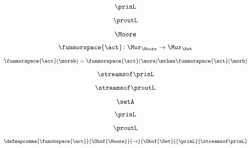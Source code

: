 \begin{forslides}
    \begin{equation}
        \label{eq:slides-processes-28}
        \prinL
    \end{equation}

    \begin{equation}
        \label{eq:slides-processes-29}
        \proutL
    \end{equation}
    
    \begin{equation}
        \label{eq:slides-processes-30}
        \Moore
    \end{equation}

    \begin{equation}
        \label{eq:slides-processes-31}
        \funmorspace{\act} \colon \Mor_\Moore \to \Mor_\Set
    \end{equation}

    \begin{equation}
        \label{eq:slides-processes-32}
        \funmorspace{\act}(\morab) = \funmorspace{\act}(\mora) \mthen \funmorspace{\act}(\morb)
    \end{equation}

    \begin{equation}
        \label{eq:slides-processes-33}
        \streamsof\prinL
    \end{equation}

    \begin{equation}
        \label{eq:slides-processes-34}
        \streamsof\proutL
    \end{equation}

    \begin{equation}
        \label{eq:slides-processes-35}
        \setA
    \end{equation}

    \begin{equation}
        \label{eq:slides-processes-36}
        \prinL
    \end{equation}

    \begin{equation}
        \label{eq:slides-processes-37}
        \proutL
    \end{equation}

    \begin{equation}
        \label{eq:slides-processes-38}
        \defmapcomma{\funobspace{\act}}
    {\Obof{\Moore}}
    {\to}
    {\Obof{\Set}}
    {\prinL}
    {\streamsof\prinL}
    \end{equation}


\end{forslides}
